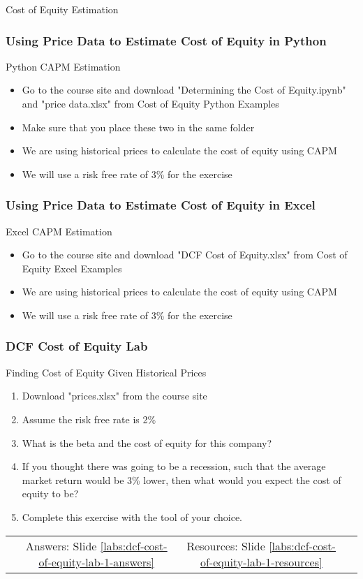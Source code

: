 \documentclass[handout, 11pt]{beamer}
\begin{document}
\begin{section}[Equity]{Cost of Equity Estimation}
\begin{frame}
\end{frame}
\begin{frame}
\frametitle{Using Price Data to Estimate Cost of Equity in Python}
{
\begin{block}{Python CAPM Estimation}
\begin{itemize}
\item Go to the course site and download "Determining the Cost of Equity.ipynb" and "price data.xlsx" from Cost of Equity Python Examples
\item Make sure that you place these two in the same folder
\item We are using historical prices to calculate the cost of equity using CAPM
\item We will use a risk free rate of 3\% for the exercise
\end{itemize}
\end{block}
}
\end{frame}
\begin{frame}
\frametitle{Using Price Data to Estimate Cost of Equity in Excel}
{
\begin{block}{Excel CAPM Estimation}
\begin{itemize}
\item Go to the course site and download "DCF Cost of Equity.xlsx" from Cost of Equity Excel Examples
\item We are using historical prices to calculate the cost of equity using CAPM
\item We will use a risk free rate of 3\% for the exercise
\end{itemize}
\end{block}
}
\end{frame}
\begin{frame}
\frametitle{DCF Cost of Equity Lab}
{
\begin{block}{Finding Cost of Equity Given Historical Prices}
\begin{enumerate}
\item Download "prices.xlsx" from the course site
\item Assume the risk free rate is 2\%
\item What is the beta and the cost of equity for this company?
\item If you thought there was going to be a recession, such that the average market return would be 3\% lower, then what would you expect the cost of equity to be?
\item Complete this exercise with the tool of your choice.
\end{enumerate}
\vfill
\begin{tabular*}{\textwidth}{@{\extracolsep{\fill}}cccc}
\toprule
\hfill & Answers: Slide \textcolor{blue}{\underline{\ref{labs:dcf-cost-of-equity-lab-1-answers}}} & Resources: Slide \textcolor{blue}{\underline{\ref{labs:dcf-cost-of-equity-lab-1-resources}}} & \hfill\\


\end{tabular*}
\end{block}}
\end{frame}
\end{section}
\end{document}
